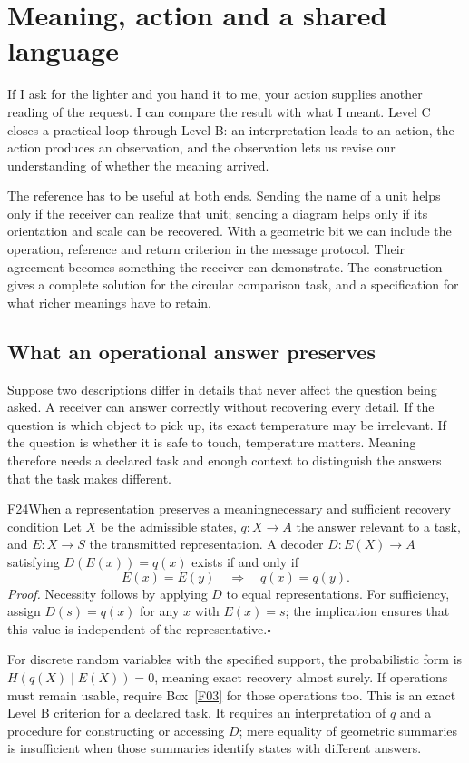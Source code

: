 \documentclass[11pt,a4paper]{article}
\begin{document}
\section{Meaning, action and a shared language}
\label{sec:meaning}

If I ask for the lighter and you hand it to me, your action supplies another
reading of the request. I can compare the result with what I meant. Level C
closes a practical loop through Level B: an interpretation leads to an action,
the action produces an observation, and the observation lets us revise our
understanding of whether the meaning arrived.

The reference has to be useful at both ends. Sending the name of a unit
helps only if the receiver can realize that unit; sending a diagram helps
only if its orientation and scale can be recovered. With a geometric bit we
can include the operation, reference and return criterion in the message
protocol. Their agreement becomes something the receiver can demonstrate.
The construction gives a complete solution for the circular comparison task,
and a specification for what richer meanings have to retain.

\subsection{What an operational answer preserves}
Suppose two descriptions differ in details that never affect the question
being asked. A receiver can answer correctly without recovering every detail.
If the question is which object to pick up, its exact temperature may be
irrelevant. If the question is whether it is safe to touch, temperature matters.
Meaning therefore needs a declared task and enough context to distinguish the
answers that the task makes different.

\begin{formal}{F24}{When a representation preserves a meaning}{necessary and sufficient recovery condition}
Let $X$ be the admissible states, $q:X\to A$ the answer relevant to a task,
and $E:X\to S$ the transmitted representation. A decoder $D:E(X)\to A$
satisfying $D(E(x))=q(x)$ exists if and only if
\begin{equation}\label{eq:fibre-test}
 E(x)=E(y)\quad\Longrightarrow\quad q(x)=q(y).
\end{equation}
\textit{Proof.} Necessity follows by applying $D$ to equal representations.
For sufficiency, assign $D(s)=q(x)$ for any $x$ with $E(x)=s$; the implication
ensures that this value is independent of the representative.\hfill$\square$

For discrete random variables with the specified support, the probabilistic
form is $H(q(X)\mid E(X))=0$, meaning exact recovery almost surely. If
operations must remain usable, require Box~\ref{F03} for those operations too.
This is an exact Level B criterion for a declared task. It requires an
interpretation of $q$ and a procedure for constructing or accessing $D$;
mere equality of geometric summaries is insufficient when those summaries
identify states with different answers.
\end{formal}
\end{document}
